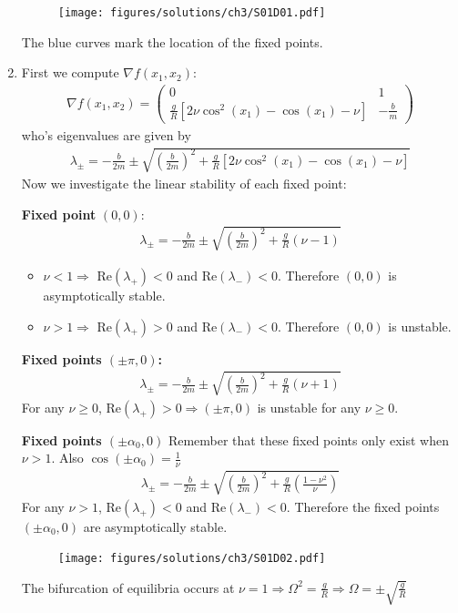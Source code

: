 \begin{solution}[3.2]
\begin{enumerate}
\begin{figure}[h]
	\centering
	\texttt{[image: figures/solutions/ch3/S01D01.pdf]}
\end{figure}
The blue curves mark the location of the fixed points.


\item First we compute $\nabla f(x_1, x_2)$:
\begin{align}
	\nabla f(x_1, x_2) = \begin{pmatrix}
		0 & 1 \\
		\displaystyle \frac{g}{R}[2\nu \cos^2(x_1) - \cos(x_1) - \nu] & \displaystyle -\frac{b}{m}
	\end{pmatrix}
\end{align}
who's eigenvalues are given by
\begin{align}
	\lambda_\pm = -\frac{b}{2m} \pm \sqrt{\left(\frac{b}{2m}\right)^2 + \frac{g}{R}[2\nu \cos^2(x_1) - \cos(x_1) - \nu]}
\end{align}
Now we investigate the linear stability of each fixed point:

\textbf{Fixed point }$(0,0)$:
\begin{align}
	\lambda_\pm = -\frac{b}{2m} \pm \sqrt{\left(\frac{b}{2m}\right)^2 + \frac{g}{R}(\nu -1)}
\end{align}
\begin{itemize}
	\item $\nu < 1 \Longrightarrow$ Re$(\lambda_+)<0$ and Re$(\lambda_-)<0$. Therefore $(0,0)$ is asymptotically stable.
	
	\item $\nu > 1 \Longrightarrow$ Re$(\lambda_+)>0$ and Re$(\lambda_-)<0$. Therefore $(0,0)$ is unstable.
\end{itemize}

\textbf{Fixed points $(\pm \pi,0)$:}
\begin{align}
	\lambda_\pm = -\frac{b}{2m} \pm \sqrt{\left(\frac{b}{2m}\right)^2 + \frac{g}{R}(\nu + 1)}
\end{align}
For any $\nu \geq 0$, Re$(\lambda_+)>0 \Longrightarrow (\pm \pi,0)$ is unstable for any $\nu \geq 0$.


\textbf{Fixed points $(\pm \alpha_0,0)$}
Remember that these fixed points only exist when $\nu > 1$. Also $\cos(\pm \alpha_0) = \frac{1}{\nu}$
\begin{align}
	\lambda_\pm = -\frac{b}{2m} \pm \sqrt{\left(\frac{b}{2m}\right)^2 + \frac{g}{R}\left( \frac{1-\nu^2}{\nu} \right)}
\end{align}
For any $\nu > 1$, Re$(\lambda_+)<0$ and Re$(\lambda_-)<0$. Therefore the fixed points $(\pm \alpha_0,0)$ are asymptotically stable. 

\begin{figure}[h]
	\centering
	\texttt{[image: figures/solutions/ch3/S01D02.pdf]}
\end{figure}

The bifurcation of equilibria occurs at $\nu = 1 \Longrightarrow \Omega^2 = \frac{g}{R} \Longrightarrow \Omega = \pm \sqrt{\frac{g}{R}}$
\end{enumerate}
\end{solution}


